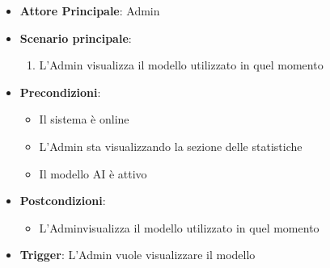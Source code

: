 \label{uc_40.3}

\begin{itemize}
    \item \textbf{Attore Principale}: Admin
	\item \textbf{Scenario principale}:
	\begin{enumerate}
		\item L'Admin visualizza il modello utilizzato in quel momento
	\end{enumerate}
	\item \textbf{Precondizioni}:
	\begin{itemize}
		\item Il sistema è online
		\item L'Admin sta visualizzando la sezione delle statistiche
		\item Il modello AI è attivo
	\end{itemize}
	\item \textbf{Postcondizioni}:
	\begin{itemize}
		\item L'Adminvisualizza il modello utilizzato in quel momento
	\end{itemize}
	\item \textbf{Trigger}: L'Admin vuole visualizzare il modello 
\end{itemize}